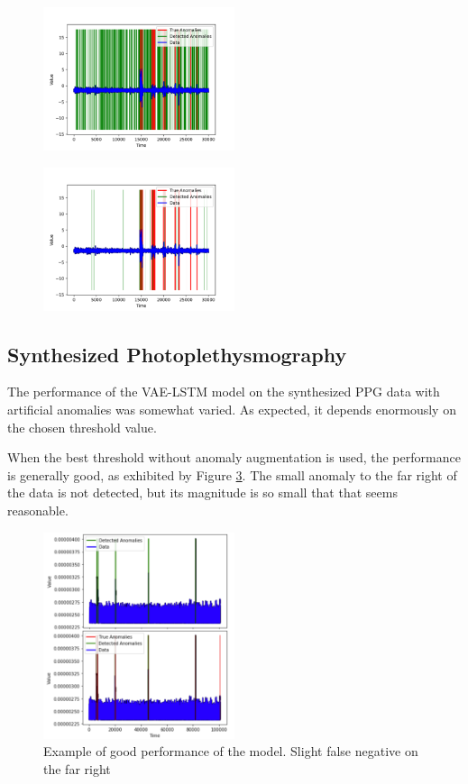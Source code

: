 \documentclass[conference]{IEEEtran}
\begin{document}
\begin{figure}[htbp]
    \centering
    \includegraphics[width=0.5\textwidth]{rf_fig_6.png}
    \caption{}
    \label{rf_fig_6}
\end{figure}

\begin{figure}[htbp]
    \centering
    \includegraphics[width=0.5\textwidth]{rf_fig_7.png}
    \caption{}
    \label{rf_fig_7}
\end{figure}


\subsection{Synthesized Photoplethysmography}
The performance of the VAE-LSTM model on the synthesized PPG data with artificial anomalies was somewhat varied. As expected, it depends enormously on the chosen threshold value.

When the best threshold without anomaly augmentation is used, the performance is generally good, as exhibited by Figure \ref{ck_fig_2}. The small anomaly to the far right of the data is not detected, but its magnitude is so small that that seems reasonable.

\begin{figure}[htbp]
    \centering
    \includegraphics[width=0.5\textwidth]{ck_fig_2.png}
    \caption{Example of good performance of the model. Slight false negative on the far right}
    \label{ck_fig_2}
\end{figure}
\end{document}
